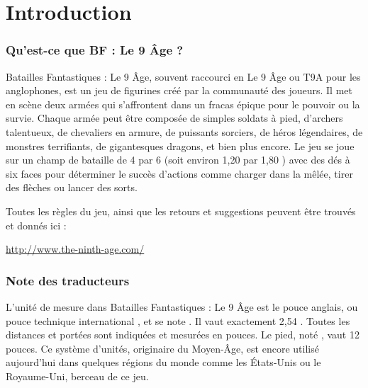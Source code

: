 
\part{Introduction}

\section{Qu'est-ce que BF : Le 9\ieme{} Âge ?}

Batailles Fantastiques : Le 9\ieme{} Âge, souvent raccourci en Le 9\ieme{} Âge ou T9A pour les anglophones, est un jeu de figurines créé par la communauté des joueurs. Il met en scène deux armées qui s'affrontent dans un fracas épique pour le pouvoir ou la survie. Chaque armée peut être composée de simples soldats à pied, d'archers talentueux, de chevaliers en armure, de puissants sorciers, de héros légendaires, de monstres terrifiants, de gigantesques dragons, et bien plus encore. Le jeu se joue sur un champ de bataille de \unit{4}{\foot} par \unit{6}{\foot} (soit environ 1,20 {\meter} par 1,80 {\meter}) avec des dés à six faces pour déterminer le succès d'actions comme charger dans la mêlée, tirer des flèches ou lancer des sorts.

Toutes les règles du jeu, ainsi que les retours et suggestions peuvent être trouvés et donnés ici :

\begin{center}
\url{http://www.the-ninth-age.com/}
\end{center}


\newpage
\section{Note des traducteurs}

L'unité de mesure dans Batailles Fantastiques : Le 9\ieme{} Âge est le pouce anglais, ou \og pouce technique international \fg{}, et se note \inch{}. Il vaut exactement 2,54 {\centi\meter}. Toutes les distances et portées sont indiquées et mesurées en pouces. Le pied, noté \foot{}, vaut 12 pouces. Ce système d'unités, originaire du Moyen-Âge, est encore utilisé aujourd'hui dans quelques régions du monde comme les États-Unis ou le Royaume-Uni, berceau de ce jeu.

